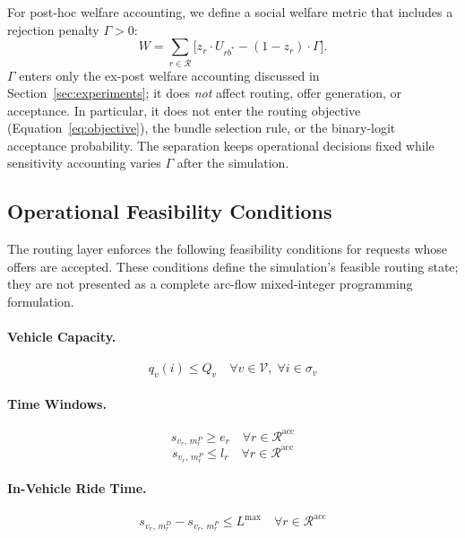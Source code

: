 For post-hoc welfare accounting, we define a social welfare metric that includes a
rejection penalty $\Gamma > 0$:
\begin{equation}\label{eq:welfare}
  W = \sum_{r \in \mathcal{R}} \bigl[ z_r \cdot U_{rb^*} - (1 - z_r) \cdot \Gamma \bigr].
\end{equation}
$\Gamma$ enters only the ex-post welfare accounting discussed in Section~\ref{sec:experiments}; it does
\emph{not} affect routing, offer generation, or acceptance. In particular, it does not
enter the routing objective (Equation~\ref{eq:objective}), the bundle selection rule, or
the binary-logit acceptance probability. The separation keeps operational decisions
fixed while sensitivity accounting varies $\Gamma$ after the simulation.

\subsection{Operational Feasibility Conditions}

The routing layer enforces the following feasibility conditions for requests whose
offers are accepted. These conditions define the simulation's feasible routing state;
they are not presented as a complete arc-flow mixed-integer programming formulation.

\paragraph{Vehicle Capacity.}
\begin{equation}\label{con:capacity}
  q_v(i) \leq Q_v \quad \forall v \in \mathcal{V},\; \forall i \in \sigma_v
\end{equation}

\paragraph{Time Windows.}
\begin{equation}\label{con:tw-early}
  s_{v_r,\, m_r^P} \geq e_r \quad \forall r \in \mathcal{R}^{\text{acc}}
\end{equation}
\begin{equation}\label{con:tw-late}
  s_{v_r,\, m_r^P} \leq l_r \quad \forall r \in \mathcal{R}^{\text{acc}}
\end{equation}

\paragraph{In-Vehicle Ride Time.}
\begin{equation}\label{con:ridetime}
  s_{v_r,\, m_r^D} - s_{v_r,\, m_r^P} \leq L^{\max} \quad \forall r \in \mathcal{R}^{\text{acc}}
\end{equation}

